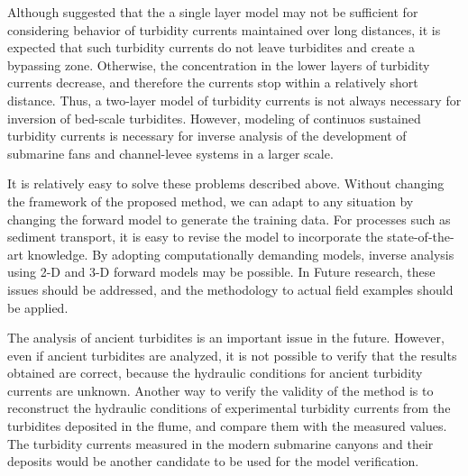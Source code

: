 Although \citet{Luchi2018} suggested that the a single layer model may not be sufficient for considering behavior of turbidity currents maintained over long distances, it is expected that such turbidity currents do not leave turbidites and create a bypassing zone. Otherwise, the concentration in the lower layers of turbidity currents decrease, and therefore the currents stop within a relatively short distance. Thus, a two-layer model of turbidity currents is not always necessary for inversion of bed-scale turbidites. However, modeling of continuos sustained turbidity currents is necessary for inverse analysis of the development of submarine fans and channel-levee systems in a larger scale. 

It is relatively easy to solve these problems described above. Without changing the framework of the proposed method, we can adapt to any situation by changing the forward model to generate the training data. For processes such as sediment transport, it is easy to revise the model to incorporate the state-of-the-art knowledge. By adopting computationally demanding models, inverse analysis using 2-D and 3-D forward models may be possible. In Future research, these issues should be addressed, and the methodology to actual field examples should be applied.

The analysis of ancient turbidites is an important issue in the future. However, even if ancient turbidites are analyzed, it is not possible to verify that the results obtained are correct, because the hydraulic conditions for ancient turbidity currents are unknown. Another way to verify the validity of the method is to reconstruct the hydraulic conditions of experimental turbidity currents from the turbidites deposited in the flume, and compare them with the measured values. The turbidity currents measured in the modern submarine canyons and their deposits would be another candidate to be used for the model verification.
